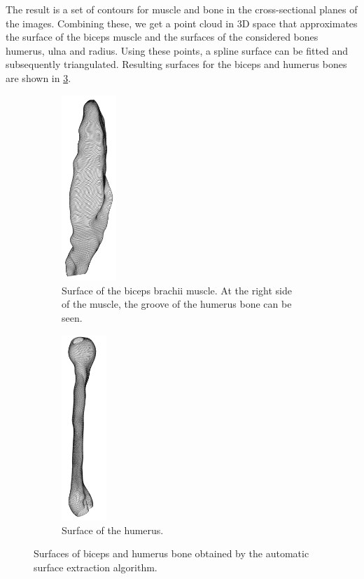 The result is a set of contours for muscle and bone in the cross-sectional planes of the images. Combining these, we get a point cloud in 3D space that approximates the surface of the biceps muscle and the surfaces of the considered bones humerus, ulna and radius. Using these points, a spline surface can be fitted and subsequently triangulated. Resulting surfaces for the biceps and humerus bones are shown in \cref{fig:extraction_result}.
%
\begin{figure}%
  \centering%
  \begin{subfigure}[t]{0.48\textwidth}%
    \centering%
    \includegraphics[height=7cm]{images/fiber_creation/extraction_biceps.png}%
    \caption{Surface of the biceps brachii muscle. At the right side of the muscle, the groove of the humerus bone can be seen.}%
    \label{fig:extraction_result_biceps}%
  \end{subfigure}
  \begin{subfigure}[t]{0.48\textwidth}%
    \centering%
    \includegraphics[height=7cm]{images/fiber_creation/extraction_humerus00.png}%
    \caption{Surface of the humerus.}%
    \label{fig:extraction_result_humerus}%
  \end{subfigure}    
  \caption{Surfaces of biceps and humerus bone obtained by the automatic surface extraction algorithm.}%
  \label{fig:extraction_result}%
\end{figure}%

